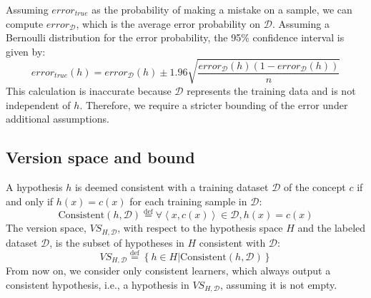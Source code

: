 Assuming $error_{true}$ as the probability of making a mistake on a sample, we can compute $error_{\mathcal{D}}$, which is the average error probability on $\mathcal{D}$.
Assuming a Bernoulli distribution for the error probability, the 95\% confidence interval is given by:
\[error_{true}(h)=error_{\mathcal{D}}(h)\pm 1.96\sqrt{\dfrac{error_{\mathcal{D}}(h)(1-error_{\mathcal{D}}(h))}{n}}\]
This calculation is inaccurate because $\mathcal{D}$ represents the training data and is not independent of $h$. 
Therefore, we require a stricter bounding of the error under additional assumptions.

\subsection{Version space and bound}
A hypothesis $h$ is deemed consistent with a training dataset $\mathcal{D}$ of the concept $c$ if and only if $h(x) = c(x)$ for each training sample in $\mathcal{D}$: 
\[\text{Consistent}(h,\mathcal{D})\overset{\text{def}}{=}\forall\left\langle x,c(x) \right\rangle\in\mathcal{D},h(x)=c(x)\]
The version space, $VS_{H,\mathcal{D}}$, with respect to the hypothesis space $H$ and the labeled dataset $\mathcal{D}$, is the subset of hypotheses in $H$ consistent with $\mathcal{D}$: 
\[VS_{H,\mathcal{D}}\overset{\text{def}}{=}\left\{h\in H|\text{Consistent}(h,\mathcal{D})\right\}\]
From now on, we consider only consistent learners, which always output a consistent hypothesis, i.e., a hypothesis in $VS_{H,\mathcal{D}}$, assuming it is not empty.

